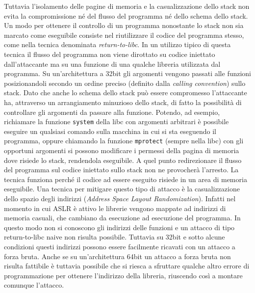 Tuttavia l'isolamento delle pagine di memoria e la casualizzazione
dello stack non evita la compromissione né del flusso del programma né
dello schema dello stack. Un modo per ottenere il controllo di un
programma nonostante lo stack non sia marcato come eseguibile consiste
nel riutilizzare il codice del programma stesso, come nella tecnica
denominata \emph{return-to-libc}\cite{c0ntex,
  solar-return-to-libc}. In un utilizzo tipico di questa tecnica il
flusso del programma non viene dirottato su codice iniettato
dall'attaccante ma su una funzione di una qualche libreria utilizzata
dal programma. Su un'architettura a 32bit gli argomenti vengono
passati alle funzioni posizionandoli secondo un ordine preciso
(definito dalla \emph{calling convention}) sullo stack. Dato che anche
lo schema dello stack può essere compromesso l'attaccante ha,
attraverso un arrangiamento minuzioso dello stack, di fatto la
possibilità di controllare gli argomenti da passare alla
funzione. Potendo, ad esempio, richiamare la funzione
\lstinline{system} della libc con argomenti arbitrari è possibile
eseguire un qualsiasi comando sulla macchina in cui si sta eseguendo
il programma, oppure chiamando la funzione \lstinline{mprotect}
(sempre nella libc) con gli opportuni argomenti si possono modificare
i permessi della pagina di memoria dove risiede lo stack, rendendola
eseguibile. A quel punto redirezionare il flusso del programma sul
codice iniettato sullo stack non ne provocherà l'arresto. La tecnica
funziona perché il codice ad essere eseguito risiede in un area di
memoria eseguibile. Una tecnica per mitigare questo tipo di attacco è
la casualizzazione dello spazio degli indirizzi (\emph{Address Space
  Layout Randomization}). Infatti nel momento in cui ASLR è attivo le
librerie vengono mappate ad indirizzi di memoria casuali, che cambiano
da esecuzione ad esecuzione del programma. In questo modo non si
conoscono gli indirizzi delle funzioni e un attacco di tipo
return-to-libc naive non risulta possibile. Tuttavia su 32bit e sotto
alcune condizioni questi indirizzi possono essere facilmente ricavati
con un attacco a forza bruta\cite{Shacham:2004}. Anche se su
un'architettura 64bit un attacco a forza bruta non risulta fattibile è
tuttavia possibile che si riesca a sfruttare qualche altro errore di
programmazione per ottenere l'indirizzo della libreria, riuscendo così
a montare comunque l'attacco.


